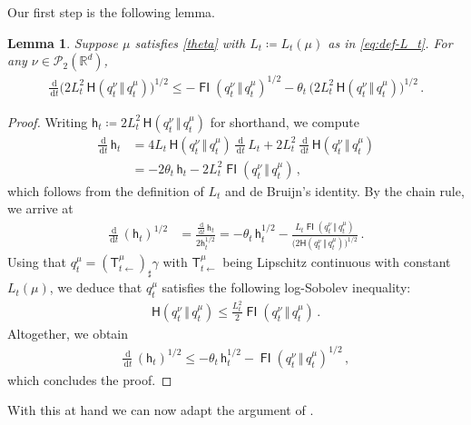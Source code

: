 \documentclass[12pt]{article}
\newcommand{\cP}{\mathcal{P}}
\newcommand{\RR}{\mathbb{R}}
\newcommand{\R}{\RR}
\newcommand{\1}{\mathds{1}}
\newcommand*{\defeq}{\coloneqq}
\newcommand*{\rd}{\mathrm{d}}
\newcommand*{\dd}{\, \rd}
\newcommand{\mmid}{\,\Vert\,}
\DeclareMathOperator*{\FI}{\mathsf{FI}}
\renewcommand{\leq}{\leqslant}
\theoremstyle{plain}
\newtheorem{lemma}[theorem]{Lemma}
\theoremstyle{definition}
\theoremstyle{remark}
\begin{document}
Our first step is the following lemma.
\begin{lemma}\label{lem:ov_new}
Suppose $\mu$ satisfies \eqref{theta} with $L_t \defeq L_t(\mu)$ as in \eqref{eq:def-L_t}. For any $\nu \in \cP_2(\R^d)$,
\begin{align*}
\frac{\dd}{\dd t} \bigl(2 L_t^2\, {\mathsf H}(q_t^\nu\mmid q_t^\mu) \bigr)^{1/2} \leq
-\FI(q^\nu_{t}\mmid q^\mu_{t})^{1/2} - \theta_{t}\,\bigl(2 L_{t}^2\, {\mathsf H}(q_{t}^\nu\mmid q_{t}^\mu) \bigr)^{1/2} \,.
\end{align*}
\end{lemma}
\begin{proof}
Writing $\mathsf h_t \defeq 2 L_{t}^2\, {\mathsf H}(q_{t}^\nu\mmid q_{t}^\mu)$ for shorthand, we compute
\begin{align*}
\frac{\dd}{\dd t}\, \mathsf h_t &= 4 L_{t}\, {\mathsf H}(q_{t}^\nu\mmid q_t^\mu)\, \frac{\dd}{\dd t}\, L_{t} + 2L_{t}^2\, \frac{\dd}{\dd t}\, {\mathsf H}(q_{t}^\nu\mmid q_{t}^\mu) \\[0.25em]
&= -2\theta_{t}\, \mathsf h_t - 2 L_{t}^2 \FI(q_{t}^\nu\mmid q_{t}^\mu)\,,
\end{align*}
which follows from the definition of $L_t$ and de Bruijn's identity. By the chain rule, we arrive at
\begin{align*}
\frac{\dd}{\dd t}\, (\mathsf h_t)^{1/2} &= \frac{\frac{\dd}{\dd t}\, \mathsf h_t}{2  \mathsf h_t^{1/2}} = -\theta_{t}\,\mathsf h_t^{1/2} - \frac{L_{t} \FI(q_{t}^\nu\mmid q_{t}^\mu)}{\bigl(2{\mathsf H}(q_{t}^\nu\mmid q_{t}^\mu)\bigr)^{1/2}}\,.
\end{align*}
Using that $q_{t}^\mu = (\mathsf T^{\mu}_{t\gets})_{\sharp}\gamma$ with $\mathsf T^{\mu}_{t\gets}$ being Lipschitz continuous with constant $L_{t}(\mu)$, we deduce that
$q_{t}^\mu$ satisfies the following log-Sobolev inequality:
\begin{align*}
{\mathsf H}(q_{t}^\nu\mmid q_{t}^\mu) \leq \frac{L_{t}^2}{2}\FI(q_{t}^\nu\mmid q_{t}^\mu)\,.
\end{align*}
Altogether, we obtain
\begin{align*}
\frac{\dd}{\dd t}\, (\mathsf h_t)^{1/2} \leq -\theta_{t}\,\mathsf h_t^{1/2} - \FI(q_{t}^\nu\mmid q_{t}^\mu)^{1/2}\,,
\end{align*}
which concludes the proof.
\end{proof}

With this at hand we can now adapt the argument of \cite{otto2000generalization}.
\end{document}
